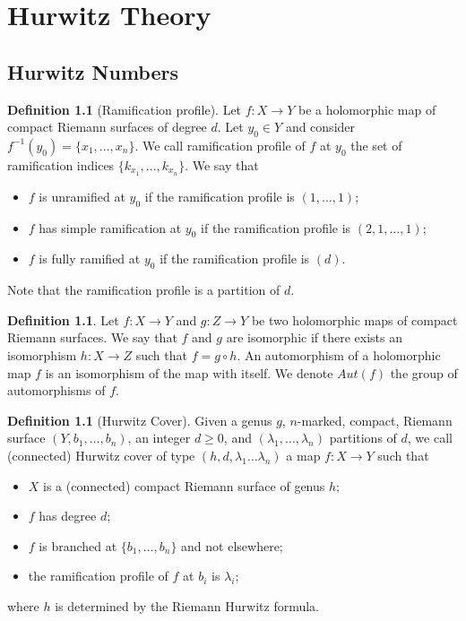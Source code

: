 \documentclass[12pt,a4paper,openright,twoside]{report}
\theoremstyle{definition} %
\newtheorem{definition}[theorem]{Definition}
\begin{document}
\chapter{Hurwitz Theory}\label{chap:HurwitzTheory}
\lhead[\fancyplain{}{\bfseries\thepage}]{\fancyplain{}{\bfseries\rightmark}}

\section{Hurwitz Numbers}

\begin{definition}[Ramification profile]
    Let \(f : X \to Y\) be a holomorphic map of compact Riemann surfaces of degree \(d\). Let \(y_0 \in Y\) and consider \(f^{-1}(y_0)=\{x_1, \ldots , x_n\}\). We call ramification profile of \(f\) at \(y_0\) the set of ramification indices 
    \(\{k_{x_1}, \ldots, k_{x_n}\}\).
    We say that
    \begin{itemize}
        \item \(f\) is unramified at \(y_0\) if the ramification profile is \((1, \ldots, 1)\);
        \item \(f\) has simple ramification at \(y_0\) if the ramification profile is \((2, 1, \ldots, 1)\);
        \item \(f\) is fully ramified at \(y_0\) if the ramification profile is \((d)\).
    \end{itemize}
    Note that the ramification profile is a partition of \(d\).
\end{definition}

\begin{definition}
    Let \(f : X \to Y\) and \(g : Z \to Y\) be two holomorphic maps of compact Riemann surfaces. We say that \(f\) and \(g\) are isomorphic if there exists an isomorphism \(h : X \to Z\) such that \(f = g \circ h\). An automorphism of a holomorphic map \(f\) is an isomorphism of the map with itself. We denote \(Aut(f)\) the group of automorphisms of \(f\).
\end{definition}


\begin{definition}[Hurwitz Cover]
    Given a genus \(g\), \(n\)-marked, compact, Riemann surface \((Y, b_1, \ldots, b_n)\), an integer \(d \geq 0\), and \( (\lambda_1, \ldots, \lambda_n)\) partitions of \(d\), we call (connected) Hurwitz cover of type \((h,d,\lambda_1 \ldots \lambda_n)\) a map \(f:X \to Y\) such that
    \begin{itemize}
        \item \(X\) is a (connected) compact Riemann surface of genus \(h\);
        \item \(f\) has degree \(d\);
        \item \(f\) is branched at \(\{b_1, \ldots, b_n\}\) and not elsewhere;
        \item the ramification profile of \(f\) at \(b_i\) is \(\lambda_i\);
    \end{itemize}
    where \(h\) is determined by the Riemann Hurwitz formula.
\end{definition}
\end{document}
